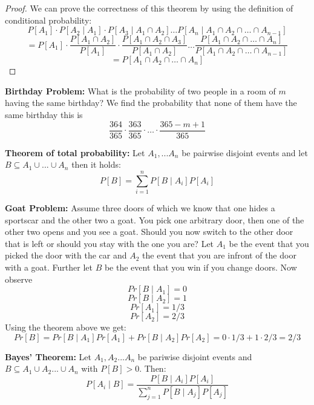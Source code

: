 \begin{proof}
    We can prove the correctness of this theorem by using the definition of conditional probability:
    $$P[A_1] \cdot P[A_2 \mid A_1] \cdot P[A_3 \mid A_1 \cap A_2] \dots P[A_n \mid A_1 \cap A_2 \cap \dots \cap A_{n-1}]$$
    $$ = P[A_1] \cdot \frac{P[A_1 \cap A_2]}{P[A_1]} \cdot \frac{P[A_1 \cap A_2 \cap A_3]}{P[A_1 \cap A_2]} \dots \frac{P[A_1 \cap A_2 \cap \dots \cap A_n]}{P[A_1 \cap A_2 \cap \dots \cap A_{n-1}]}$$
    $$ = P[A_1 \cap A_2 \cap \dots \cap A_n]$$
\end{proof}

\begin{example}
    \textbf{Birthday Problem: } What is the probability of two people in a room of $m$ having the same birthday? We find the probability that none of them have the same birthday this is 
    $$\frac{364}{365} \cdot \frac{363}{365} \cdot \dots \cdot \frac{365-m+1}{365}$$
\end{example}

\begin{theorem}
    \textbf{Theorem of total probability: }Let $A_1, ... A_n$ be pairwise disjoint events and let $B \subseteq A_1 \cup ... \cup A_n$ then it holds:
    $$P[B] = \sum_{i=1}^n P[B \mid A_i] P[A_i]$$
\end{theorem}

\begin{example}
    \textbf{Goat Problem: } Assume three doors of which we know that one hides a sportscar and the other two a goat. You pick one arbitrary door, then one of the other two opens and you see a goat. Should you now switch to the other door that is left or should you stay with the one you are?
    Let $A_1$ be the event that you picked the door with the car and $A_2$ the event that you are infront of the door with a goat. Further let $B$ be the event that you win if you change doors. Now observe
    $$Pr[B \mid A_1] = 0$$
    $$Pr[B \mid A_2] = 1$$
    $$Pr[A_1] = 1/3$$
    $$Pr[A_2] = 2/3$$
    Using the theorem above we get:
    $$Pr[B] = Pr[B \mid A_1] Pr[A_1] + Pr[B \mid A_2] Pr[A_2] = 0 \cdot 1/3 + 1 \cdot 2/3 = 2/3$$
\end{example}

\begin{theorem}
    \textbf{Bayes' Theorem: } Let $A_1, A_2 ... A_n$ be pariwise disjoint events and $B \subseteq A_1 \cup A_2 ... \cup A_n$ with $P[B] > 0$. Then:
    $$P[A_i \mid B] = \frac{P[B \mid A_i] P[A_i]}{\sum_{j=1}^n P[B \mid A_j] P[A_j]}$$
\end{theorem}

